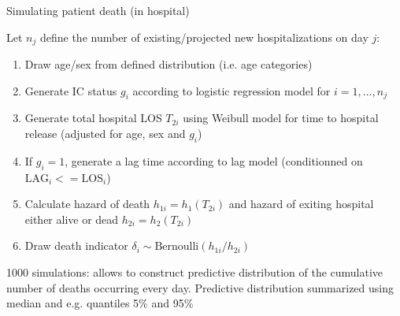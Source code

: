 \documentclass[t,9pt,xcolor=dvipsnames]{beamer}              %
\begin{document}
\begin{frame}{Simulating patient death (in hospital)}
\justifying

Let $n_{j}$ define the number of existing/projected new hospitalizations on day $j$:
\begin{enumerate}
\item Draw age/sex from defined distribution (i.e. age categories)
\item Generate IC status $g_{i}$ according to logistic regression model for $i=1,...,n_{j}$
\item Generate total hospital LOS $T_{2i}$ using Weibull model for time to hospital release (adjusted for age, sex and $g_{i}$)
\item If $g_{i}=1$, generate a lag time according to lag model (conditionned on $\text{LAG}_{i}<=\text{LOS}_{i}$)
\item Calculate hazard of death $h_{1i}=h_{1}(T_{2i})$ and hazard of exiting hospital either alive or dead $h_{2i}=h_{2}(T_{2i})$
\item Draw death indicator $\delta_{i} \sim \text{Bernoulli}(h_{1i}/h_{2i})$
\end{enumerate}

1000 simulations: allows to construct predictive distribution of the cumulative number of deaths occurring every day. Predictive distribution summarized using median and e.g. quantiles 5\% and 95\%

\note{
\tiny
\justifying

}
\end{frame}
\end{document}
